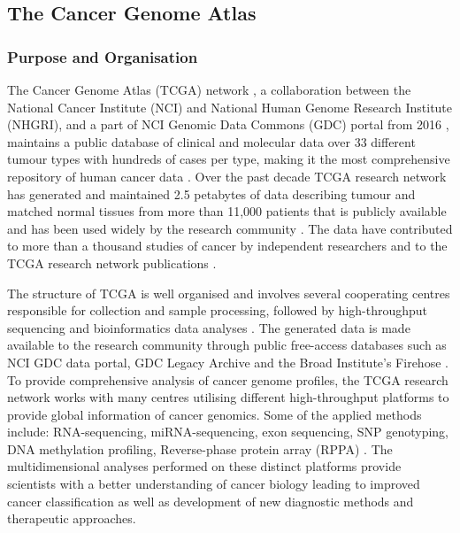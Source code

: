     \newpage    
    \subsection{The Cancer Genome Atlas}
    
    
    
    \subsubsection{Purpose and Organisation}

    The Cancer Genome Atlas (TCGA) network \cite{TheTCGA}, a collaboration between the National Cancer Institute (NCI) and National Human Genome Research Institute (NHGRI), and a part of NCI Genomic Data Commons (GDC) portal from 2016 \cite{NCICommons, gdc2016}, maintains a public database of clinical and molecular data over 33 different tumour types with hundreds of cases per type, making it the most comprehensive repository of human cancer data \cite{OverviewTCGA}. Over the past decade TCGA research network has generated and maintained 2.5 petabytes of data describing tumour and matched normal tissues from more than 11,000 patients that is publicly available and has been used widely by the research community \cite{OverviewTCGA}. The data have contributed to more than a thousand studies of cancer by independent researchers and to the TCGA research network publications \cite{Editorial.2015TheGenomics}.

    The structure of TCGA is well organised and involves several cooperating centres responsible for collection and sample processing, followed by high-throughput sequencing and bioinformatics data analyses \cite{OverviewTCGA, Tomczak2015TheKnowledge}. The generated data is made available to the research community through public free-access databases such as NCI GDC data portal, GDC Legacy Archive and the Broad Institute’s Firehose \cite{Silva2016TCGAPackages}. \\To provide comprehensive analysis of cancer genome profiles, the TCGA research network works with many centres utilising different high-throughput platforms to provide global information of cancer genomics. Some of the applied methods include: RNA-sequencing, miRNA-sequencing, exon sequencing, SNP genotyping, DNA methylation profiling, Reverse-phase protein array (RPPA) \cite{OverviewTCGA}. The multidimensional analyses performed on these distinct platforms provide scientists with a better understanding of cancer biology leading to improved cancer classification as well as development of new diagnostic methods and therapeutic approaches.\\




